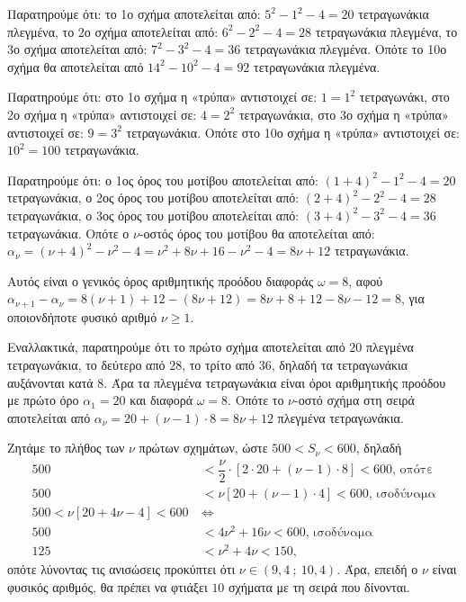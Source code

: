 
\begin{alist}
\item
\begin{rlist}
\item Παρατηρούμε ότι: 
το 1ο σχήμα αποτελείται από: $5^2 - 1^2 - 4 = 20$ τετραγωνάκια πλεγμένα,
το 2ο σχήμα αποτελείται από: $6^2 - 2^2 - 4 = 28$ τετραγωνάκια πλεγμένα,
το 3ο σχήμα αποτελείται από: $7^2 - 3^2 - 4 = 36$ τετραγωνάκια πλεγμένα.
Οπότε το 10ο σχήμα θα αποτελείται από $14^2 - 10^2 - 4 = 92$ τετραγωνάκια πλεγμένα.

\item Παρατηρούμε ότι:
στο 1ο σχήμα η «τρύπα» αντιστοιχεί σε: $1 = 1^2$ τετραγωνάκι,
στο 2ο σχήμα η «τρύπα» αντιστοιχεί σε: $4 = 2^2$ τετραγωνάκια,
στο 3ο σχήμα η «τρύπα» αντιστοιχεί σε: $9 = 3^2$ τετραγωνάκια.
Οπότε στο 10ο σχήμα η «τρύπα» αντιστοιχεί σε: $10^2 = 100$ τετραγωνάκια.
\end{rlist}

\item Παρατηρούμε ότι:
ο 1ος όρος του μοτίβου αποτελείται από: $(1 + 4)^2 - 1^2 - 4 = 20$ τετραγωνάκια,
ο 2ος όρος του μοτίβου αποτελείται από: $(2 + 4)^2 - 2^2 - 4 = 28$ τετραγωνάκια,
ο 3ος όρος του μοτίβου αποτελείται από: $(3 + 4)^2 - 3^2 - 4 = 36$ τετραγωνάκια.
Οπότε ο $\nu$-οστός όρος του μοτίβου θα αποτελείται από: $\alpha_\nu = (\nu + 4)^2 - \nu^2 - 4 = \nu^2 + 8\nu + 16 - \nu^2 - 4 = 8\nu + 12$ τετραγωνάκια.

Αυτός είναι ο γενικός όρος αριθμητικής προόδου διαφοράς $\omega = 8$, αφού
$\alpha_{\nu+1} - \alpha_\nu = 8(\nu + 1) + 12 - (8\nu + 12) = 8\nu + 8 + 12 - 8\nu - 12 = 8$, για οποιονδήποτε φυσικό αριθμό $\nu \ge 1$.

Εναλλακτικά, παρατηρούμε ότι το πρώτο σχήμα αποτελείται από $20$ πλεγμένα τετραγωνάκια, το δεύτερο από $28$, το τρίτο από $36$, δηλαδή τα τετραγωνάκια αυξάνονται κατά $8$. Άρα τα πλεγμένα τετραγωνάκια είναι όροι αριθμητικής προόδου με πρώτο όρο $\alpha_1 = 20$ και διαφορά $\omega = 8$. Οπότε το $\nu$-οστό σχήμα στη σειρά αποτελείται από $\alpha_\nu = 20 + (\nu - 1) \cdot 8 = 8\nu + 12$ πλεγμένα τετραγωνάκια.

\item
\begin{rlist}
\item Ζητάμε το πλήθος των $\nu$ πρώτων σχημάτων, ώστε $500 < S_\nu < 600$, δηλαδή
\begin{align*}
500 &< \dfrac{\nu}{2} \cdot [2 \cdot 20 + (\nu - 1) \cdot 8] < 600\text{, οπότε} \\
500 &< \nu[20 + (\nu - 1) \cdot 4] < 600\text{, ισοδύναμα} \\
500 < \nu[20 + 4\nu - 4] < 600 \ &\Leftrightarrow \\
500 &< 4\nu^2 + 16\nu < 600\text{, ισοδύναμα} \\
125 &< \nu^2 + 4\nu < 150,
\end{align*}
οπότε λύνοντας τις ανισώσεις προκύπτει ότι $\nu \in (9,4 \ ; \ 10,4)$. Άρα, επειδή ο $\nu$ είναι φυσικός αριθμός, θα πρέπει να φτιάξει $10$ σχήματα με τη σειρά που δίνονται.


\end{rlist}
\end{alist}
